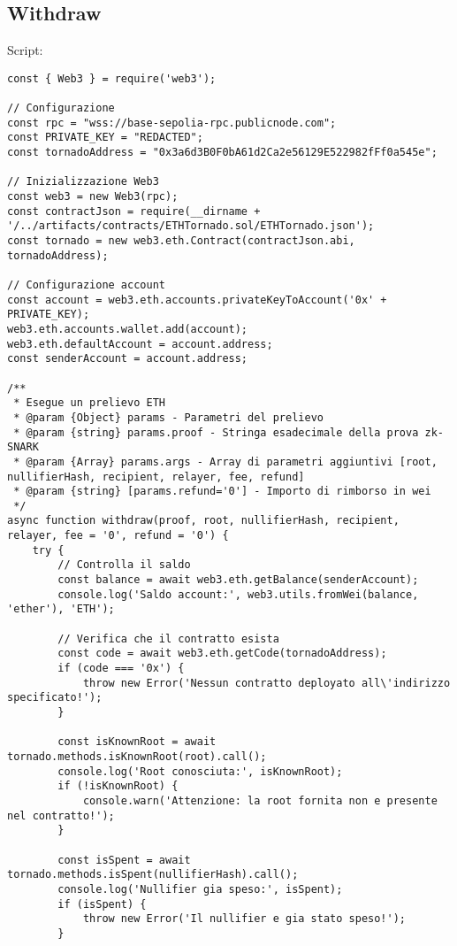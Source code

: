 \subsection{Withdraw}

Script:

\begin{lstlisting}
const { Web3 } = require('web3');

// Configurazione
const rpc = "wss://base-sepolia-rpc.publicnode.com";
const PRIVATE_KEY = "REDACTED";
const tornadoAddress = "0x3a6d3B0F0bA61d2Ca2e56129E522982fFf0a545e";

// Inizializzazione Web3
const web3 = new Web3(rpc);
const contractJson = require(__dirname + '/../artifacts/contracts/ETHTornado.sol/ETHTornado.json');
const tornado = new web3.eth.Contract(contractJson.abi, tornadoAddress);

// Configurazione account
const account = web3.eth.accounts.privateKeyToAccount('0x' + PRIVATE_KEY);
web3.eth.accounts.wallet.add(account);
web3.eth.defaultAccount = account.address;
const senderAccount = account.address;

/**
 * Esegue un prelievo ETH
 * @param {Object} params - Parametri del prelievo
 * @param {string} params.proof - Stringa esadecimale della prova zk-SNARK
 * @param {Array} params.args - Array di parametri aggiuntivi [root, nullifierHash, recipient, relayer, fee, refund]
 * @param {string} [params.refund='0'] - Importo di rimborso in wei
 */
async function withdraw(proof, root, nullifierHash, recipient, relayer, fee = '0', refund = '0') {
    try {
        // Controlla il saldo
        const balance = await web3.eth.getBalance(senderAccount);
        console.log('Saldo account:', web3.utils.fromWei(balance, 'ether'), 'ETH');

        // Verifica che il contratto esista
        const code = await web3.eth.getCode(tornadoAddress);
        if (code === '0x') {
            throw new Error('Nessun contratto deployato all\'indirizzo specificato!');
        }

        const isKnownRoot = await tornado.methods.isKnownRoot(root).call();
        console.log('Root conosciuta:', isKnownRoot);
        if (!isKnownRoot) {
            console.warn('Attenzione: la root fornita non e presente nel contratto!');
        }

        const isSpent = await tornado.methods.isSpent(nullifierHash).call();
        console.log('Nullifier gia speso:', isSpent);
        if (isSpent) {
            throw new Error('Il nullifier e gia stato speso!');
        }


\end{lstlisting}
